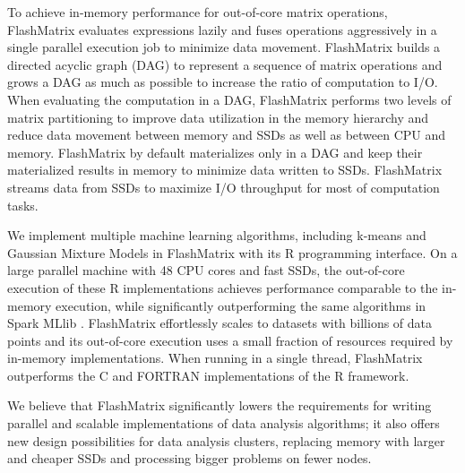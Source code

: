 To achieve in-memory performance for out-of-core matrix operations,
FlashMatrix evaluates expressions lazily and fuses operations aggressively
in a single parallel execution job to minimize data movement. FlashMatrix
builds a directed acyclic graph (DAG) to represent a sequence of matrix
operations and grows a DAG as much as possible to increase the ratio of
computation to I/O. When evaluating the computation in a DAG, FlashMatrix
performs two levels of matrix partitioning to improve data utilization in
the memory hierarchy and reduce data movement between memory and SSDs
as well as between CPU and memory. FlashMatrix by default materializes
only  in a DAG and keep their materialized results in
memory to minimize data written to SSDs. FlashMatrix streams
data from SSDs to maximize I/O throughput for most of computation tasks.



We implement multiple machine learning algorithms, including k-means \cite{kmeans}
and Gaussian Mixture Models \cite{gmm} in FlashMatrix with its R programming
interface. On a large parallel machine with 48
CPU cores and fast SSDs, the out-of-core execution of these R implementations
achieves performance comparable to the in-memory execution,
while significantly outperforming the same algorithms in Spark MLlib
\cite{spark}. FlashMatrix effortlessly scales to datasets with billions
of data points and its out-of-core execution uses a small fraction of
resources required by in-memory implementations. 
When running in a single thread, FlashMatrix 
outperforms the C and FORTRAN implementations of the R framework.

We believe that FlashMatrix significantly lowers the requirements for writing parallel
and scalable implementations of data analysis algorithms; it also offers new
design possibilities for data analysis clusters, replacing memory with larger
and cheaper SSDs and processing bigger problems on fewer nodes.
